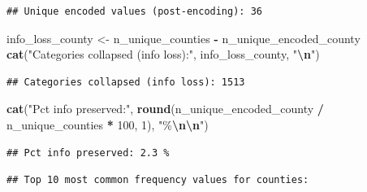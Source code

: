 \documentclass[
]{article}
\newenvironment{Shaded}{\begin{snugshade}}{\end{snugshade}}
\newcommand{\CommentTok}[1]{\textcolor[rgb]{0.56,0.35,0.01}{\textit{#1}}}
\newcommand{\DecValTok}[1]{\textcolor[rgb]{0.00,0.00,0.81}{#1}}
\newcommand{\FunctionTok}[1]{\textcolor[rgb]{0.13,0.29,0.53}{\textbf{#1}}}
\newcommand{\NormalTok}[1]{#1}
\newcommand{\OtherTok}[1]{\textcolor[rgb]{0.56,0.35,0.01}{#1}}
\newcommand{\SpecialCharTok}[1]{\textcolor[rgb]{0.81,0.36,0.00}{\textbf{#1}}}
\newcommand{\StringTok}[1]{\textcolor[rgb]{0.31,0.60,0.02}{#1}}
\begin{document}
\begin{verbatim}
## Unique encoded values (post-encoding): 36
\end{verbatim}

\begin{Shaded}
\begin{Highlighting}[]
\NormalTok{info\_loss\_county }\OtherTok{\textless{}{-}}\NormalTok{ n\_unique\_counties }\SpecialCharTok{{-}}\NormalTok{ n\_unique\_encoded\_county}
\FunctionTok{cat}\NormalTok{(}\StringTok{"Categories collapsed (info loss):"}\NormalTok{, info\_loss\_county, }\StringTok{"}\SpecialCharTok{\textbackslash{}n}\StringTok{"}\NormalTok{)}
\end{Highlighting}
\end{Shaded}

\begin{verbatim}
## Categories collapsed (info loss): 1513
\end{verbatim}

\begin{Shaded}
\begin{Highlighting}[]
\FunctionTok{cat}\NormalTok{(}\StringTok{"Pct info preserved:"}\NormalTok{,}
    \FunctionTok{round}\NormalTok{(n\_unique\_encoded\_county }\SpecialCharTok{/}\NormalTok{ n\_unique\_counties }\SpecialCharTok{*} \DecValTok{100}\NormalTok{, }\DecValTok{1}\NormalTok{), }\StringTok{"\%}\SpecialCharTok{\textbackslash{}n\textbackslash{}n}\StringTok{"}\NormalTok{)}
\end{Highlighting}
\end{Shaded}

\begin{verbatim}
## Pct info preserved: 2.3 %
\end{verbatim}

\begin{Shaded}
\end{Shaded}

\begin{verbatim}
## Top 10 most common frequency values for counties:
\end{verbatim}
\end{document}
